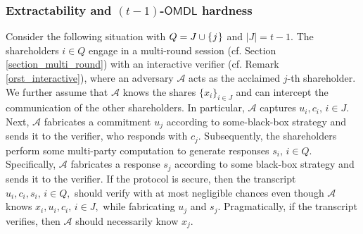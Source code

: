 \documentclass{iacrtrans}
\begin{document}
\subsubsection{Extractability and $(t-1)$-$\mathsf{OMDL}$ hardness}\label{section_extractability_and_omdl}
Consider the following situation with
$Q = J \cup \{\hspace{0.5pt}j\hspace{0.5pt}\}$ and
$|J| = t-1$.
The shareholders $i \in Q$ engage
in a multi-round session
(cf. Section \ref{section_multi_round})
with an interactive verifier
(cf. Remark \ref{orst_interactive}),
where an adversary $\mathcal{A}$
acts as the acclaimed $j$-th shareholder.
We further assume that $\mathcal{A}$
knows the shares $\{x_i\}_{i \in J}$
and can intercept the communication
of the other shareholders.
In particular, $\mathcal{A}$ captures
$u_i, c_i,\hspace{2pt} i \in J$.
Next, $\mathcal{A}$ fabricates a commitment $u_j$
according to some-black-box strategy and sends it to the
verifier, who responds with $c_j$.
Subsequently, the shareholders
perform some multi-party computation
to generate responses $s_i,\hspace{2pt}i\in Q$.
Specifically, $\mathcal{A}$ fabricates a response $s_j$
according to some black-box strategy and sends it to the verifier.
If the protocol is secure, then the transcript
$u_i, c_i, s_i,\hspace{2pt} i \in Q,$
should verify with at most negligible chances
even though $\mathcal{A}$ knows
$x_i, u_i, c_i,\hspace{2pt} i \in J,$
while fabricating $u_j$ and $s_j$.
Pragmatically, if the transcript verifies,
then $\mathcal{A}$ should necessarily know $x_j$.
\end{document}

